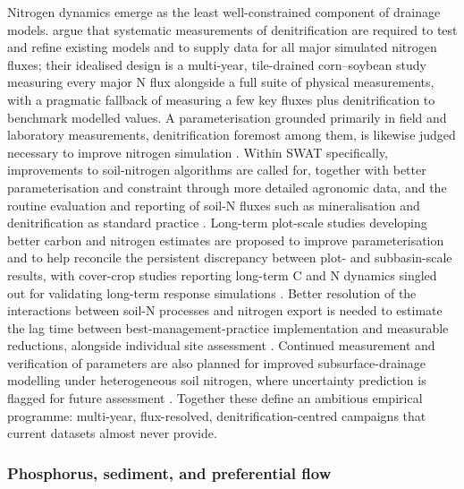 \documentclass[11pt]{article}
\begin{document}
Nitrogen dynamics emerge as the least well-constrained component of drainage models. \textcite{David2009} argue that systematic measurements of denitrification are required to test and refine existing models and to supply data for all major simulated nitrogen fluxes; their idealised design is a multi-year, tile-drained corn--soybean study measuring every major N flux alongside a full suite of physical measurements, with a pragmatic fallback of measuring a few key fluxes plus denitrification to benchmark modelled values. A parameterisation grounded primarily in field and laboratory measurements, denitrification foremost among them, is likewise judged necessary to improve nitrogen simulation \parencite{Salazar2009}. Within SWAT specifically, improvements to soil-nitrogen algorithms are called for, together with better parameterisation and constraint through more detailed agronomic data, and the routine evaluation and reporting of soil-N fluxes such as mineralisation and denitrification as standard practice \parencite{Ikenberry2017}. Long-term plot-scale studies developing better carbon and nitrogen estimates are proposed to improve parameterisation and to help reconcile the persistent discrepancy between plot- and subbasin-scale results, with cover-crop studies reporting long-term C and N dynamics singled out for validating long-term response simulations \parencite{Singer2011}. Better resolution of the interactions between soil-N processes and nitrogen export is needed to estimate the lag time between best-management-practice implementation and measurable reductions, alongside individual site assessment \parencite{Law2022}. Continued measurement and verification of parameters are also planned for improved subsurface-drainage modelling under heterogeneous soil nitrogen, where uncertainty prediction is flagged for future assessment \parencite{Tao2021}. Together these define an ambitious empirical programme: multi-year, flux-resolved, denitrification-centred campaigns that current datasets almost never provide.

\subsubsection{Phosphorus, sediment, and preferential flow}
\end{document}
